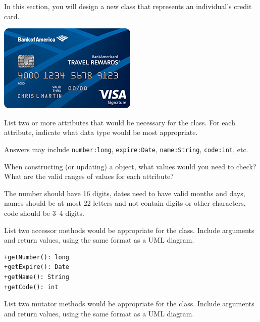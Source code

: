 
In this section, you will design a new class that represents an individual's credit card.

\begin{center}
\includegraphics{credit-card.png}
\end{center}




\Q List two or more attributes that would be necessary for the  class.
For each attribute, indicate what data type would be most appropriate.

\begin{answer}
Answers may include \verb|number:long|, \verb|expire:Date|, \verb|name:String|, \verb|code:int|, etc.
\end{answer}


\Q When constructing (or updating) a  object, what values would you need to check?
What are the valid ranges of values for each attribute?

\begin{answer}
The number should have 16 digits, dates need to have valid months and days, names should be at most 22 letters and not contain digits or other characters, code should be 3--4 digits.
\end{answer}


\Q List two accessor methods would be appropriate for the  class.
Include arguments and return values, using the same format as a UML diagram.

\begin{answer}[6em]
\begin{verbatim}
+getNumber(): long
+getExpire(): Date
+getName(): String
+getCode(): int
\end{verbatim}
\end{answer}


\Q List two mutator methods would be appropriate for the  class.
Include arguments and return values, using the same format as a UML diagram.


